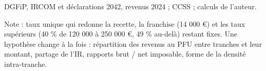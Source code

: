 DGFiP, IRCOM et déclarations 2042, revenus 2024 ; CCSS ; calculs de l'auteur.\par Note : taux unique qui redonne la recette, la franchise (14 000 \euro{}) et les taux supérieurs (40 \% de 120 000 à 250 000 \euro{}, 49 \% au-delà) restant fixes. Une hypothèse change à la fois : répartition des revenus au PFU entre tranches et leur montant, partage de l'IR, rapports brut / net imposable, forme de la densité intra-tranche.
